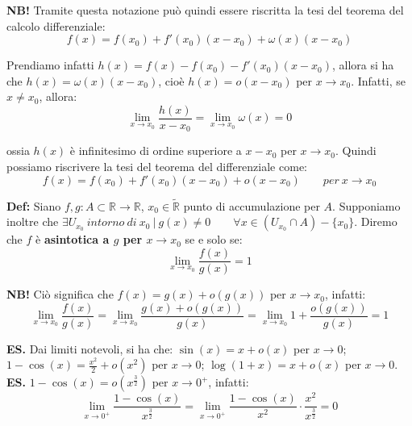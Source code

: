 \documentclass{article}
\begin{document}
\noindent\textbf{NB!} Tramite questa notazione può quindi essere riscritta la tesi del teorema del calcolo differenziale:
\begin{equation*}
    f(x) = f(x_0) + f'(x_0)(x - x_0) + \omega(x)(x - x_0)
\end{equation*}

\noindent Prendiamo infatti $h(x) = f(x) - f(x_0) - f'(x_0)(x - x_0)$, allora si ha che $h(x) = \omega(x)(x - x_0)$, cioè $h(x) = o(x - x_0)$ per $x \to x_0$. Infatti, se $x \neq x_0$, allora:
\begin{equation*}
    \lim_{x \to x_0} \frac{h(x)}{x - x_0} = \lim_{x \to x_0} \omega(x) = 0
\end{equation*}

\noindent ossia $h(x)$ è infinitesimo di ordine superiore a $x - x_0$ per $x \to x_0$. Quindi possiamo riscrivere la tesi del teorema del differenziale come:
\begin{equation*}
    f(x) = f(x_0) + f'(x_0)(x - x_0) + o(x -x_0) \qquad per \ x \to x_0
\end{equation*}

\noindent\textbf{Def:} Siano $f, g: A \subset \mathbb{R} \xrightarrow{} \mathbb{R}$, $x_0 \in \widetilde{\mathbb{R}}$ punto di accumulazione per $A$. Supponiamo inoltre che $\exists U_{x_0} \ intorno \ di \ x_0 \ | \ g(x) \neq 0 \qquad \forall x \in (U_{x_0} \cap A) - \{x_0\}$. Diremo che $f$ è \textbf{asintotica a $g$ per $x \to x_0$} se e solo se:
\begin{equation*}
    \lim_{x \to x_0} \frac{f(x)}{g(x)} = 1
\end{equation*}

\noindent\textbf{NB!} Ciò significa che $f(x) = g(x) + o(g(x))$ per $x \to x_0$, infatti:
\begin{equation*}
    \lim_{x \to x_0} \frac{f(x)}{g(x)} = \lim_{x \to x_0} \frac{g(x) + o(g(x))}{g(x)} = \lim_{x \to x_0} 1 + \frac{o(g(x))}{g(x)} = 1
\end{equation*}

\noindent\textbf{ES.} Dai limiti notevoli, si ha che: $\sin(x) = x + o(x)$ per $x \to 0$; $1 - \cos(x) = \frac{x^2}{2} + o(x^2)$ per $x \to 0$; $\log(1 + x) = x + o(x)$ per $x \to 0$. \\

\noindent\textbf{ES.} $1 - \cos(x) = o(x^\frac{3}{2})$ per $x \to 0^+$, infatti:
\begin{equation*}
    \lim_{x \to 0^+} \frac{1 - \cos(x)}{x^\frac{3}{2}} = \lim_{x \to 0^+} \frac{1 - \cos(x)}{x^2} \cdot \frac{x^2}{x^\frac{3}{2}} = 0
\end{equation*}
\end{document}

